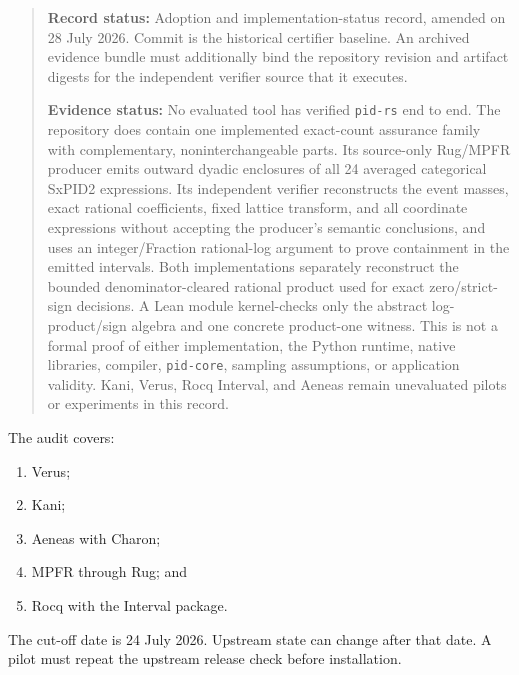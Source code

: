 \documentclass[11pt]{article}
\begin{document}
\begin{quote}
\textbf{Record status:} Adoption and implementation-status record, amended on 28 July 2026.
Commit  is the historical certifier baseline.
An archived evidence bundle must additionally bind the repository revision and artifact digests
for the independent verifier source that it executes.

\textbf{Evidence status:} No evaluated tool has verified \texttt{pid-rs} end to end.  The repository
does contain one implemented exact-count assurance family with complementary, noninterchangeable
parts.  Its source-only Rug/MPFR producer emits outward dyadic enclosures of all 24 averaged
categorical SxPID2 expressions.  Its independent verifier reconstructs the event masses, exact
rational coefficients, fixed lattice transform, and all coordinate expressions without accepting
the producer's semantic conclusions, and uses an integer/Fraction rational-log argument to prove
containment in the emitted intervals.  Both implementations separately reconstruct the bounded
denominator-cleared rational product used for exact zero/strict-sign decisions.  A Lean module
kernel-checks only the abstract log-product/sign algebra and one concrete product-one witness.  This
is not a formal proof of either implementation, the Python runtime, native libraries, compiler,
\texttt{pid-core}, sampling assumptions, or application validity.  Kani, Verus, Rocq Interval, and
Aeneas remain unevaluated pilots or experiments in this record.
\end{quote}

The audit covers:
\begin{enumerate}[leftmargin=*]
  \item Verus;
  \item Kani;
  \item Aeneas with Charon;
  \item MPFR through Rug; and
  \item Rocq with the Interval package.
\end{enumerate}

The cut-off date is 24 July 2026.  Upstream state can change after that date.  A pilot must repeat
the upstream release check before installation.
\end{document}
